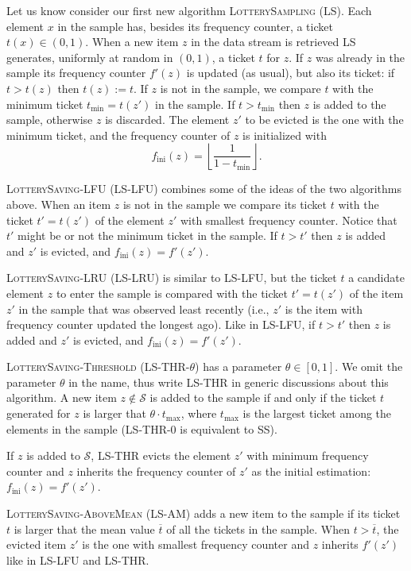 \documentclass{article}
\begin{document}
Let us know consider our first new algorithm \textsc{LotterySampling} (LS).
Each element $x$ in the sample has, besides its frequency counter, a ticket
$t(x)\in(0,1)$. When a new item $z$ in the data stream is retrieved
LS generates, uniformly at random in $(0,1)$, a ticket $t$ for $z$. If $z$
was already in the sample its frequency counter $f'(z)$ is updated (as usual),
but also its ticket: if $t > t(z)$ then $t(z):= t$. If $z$ is not
in the sample, we compare $t$ with the minimum ticket $t_\text{min}=t(z')$
in the sample. If $t > t_\text{min}$ then $z$ is added to the sample,
otherwise $z$ is discarded. The element $z'$ to be evicted is the one with the
minimum ticket, and the frequency counter of $z$ is initialized with
\[
f_\text{ini}(z)=\left\lfloor\frac{1}{1-t_\text{min}}\right\rfloor.
\]

\textsc{LotterySaving-LFU} (LS-LFU) combines some of the ideas of the two
algorithms above. When an item $z$ is not in the sample we compare its
ticket $t$ with the ticket $t'=t(z')$ of the element $z'$
with smallest frequency counter. Notice that $t'$ might be or not the minimum
ticket in the sample. If $t > t'$ then $z$ is added and $z'$ is evicted, and
$f_\text{ini}(z)=f'(z')$.

\textsc{LotterySaving-LRU} (LS-LRU) is similar to LS-LFU, but the ticket
$t$ a candidate element $z$ to enter the sample is compared with the
ticket $t'=t(z')$ of the item $z'$
in the sample that was observed least recently (i.e., 
$z'$ is the item with frequency counter updated the longest ago). 
Like in LS-LFU, if $t > t'$ then $z$ is added and $z'$ is evicted, and
$f_\text{ini}(z)=f'(z')$.

\textsc{LotterySaving-Threshold} (LS-THR-$\theta$) has a parameter
$\theta\in[0,1]$.
We omit the parameter $\theta$ in the name, thus write LS-THR in
generic discussions about
this algorithm.
A new item $z\not\in\mathcal{S}$ is added to the sample if and only if
the ticket $t$ generated for $z$ is larger that $\theta\cdot t_\text{max}$,
where $t_\text{max}$ is the largest ticket among the elements in the sample
(LS-THR-0 is equivalent to SS).

If $z$ is added to $\mathcal{S}$, LS-THR evicts the element $z'$
with minimum frequency counter and $z$ inherits the frequency counter
of $z'$ as the initial estimation: $f_\text{ini}(z)=f'(z')$.

\textsc{LotterySaving-AboveMean} (LS-AM) adds a  new item to the sample
if its ticket $t$ is larger that the mean value $\overline{t}$ of all
the tickets in the sample. When $t > \overline{t}$, the evicted item $z'$
is the one with smallest frequency counter and $z$ inherits $f'(z')$ like
in LS-LFU and LS-THR.
\end{document}

